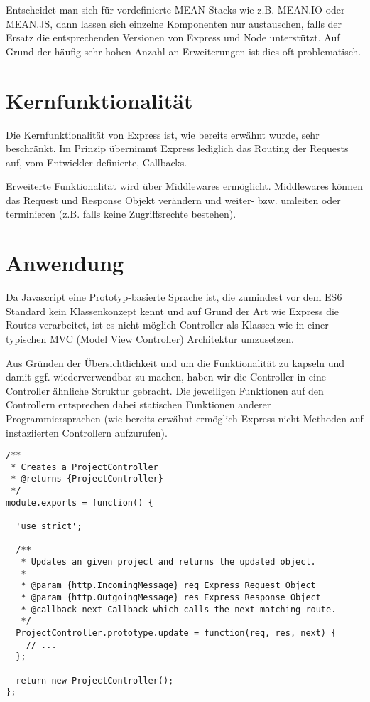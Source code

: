 Entscheidet man sich für vordefinierte MEAN Stacks wie z.B. MEAN.IO oder
MEAN.JS, dann lassen sich einzelne Komponenten nur austauschen, falls
der Ersatz die entsprechenden Versionen von Express und Node
unterstützt. Auf Grund der häufig sehr hohen Anzahl an Erweiterungen ist
dies oft problematisch.

\chapter{Kernfunktionalität}\label{kernfunktionalituxe4t}

Die Kernfunktionalität von Express ist, wie bereits erwähnt wurde, sehr
beschränkt. Im Prinzip übernimmt Express lediglich das Routing der
Requests auf, vom Entwickler definierte, Callbacks.

Erweiterte Funktionalität wird über Middlewares ermöglicht. Middlewares
können das Request und Response Objekt verändern und weiter- bzw.
umleiten oder terminieren (z.B. falls keine Zugriffsrechte bestehen).

\chapter{Anwendung}\label{anwendung}

Da Javascript eine Prototyp-basierte Sprache ist, die zumindest vor dem
ES6 Standard kein Klassenkonzept kennt und auf Grund der Art wie Express
die Routes verarbeitet, ist es nicht möglich Controller als Klassen wie
in einer typischen MVC (Model View Controller) Architektur umzusetzen.

Aus Gründen der Übersichtlichkeit und um die Funktionalität zu kapseln
und damit ggf. wiederverwendbar zu machen, haben wir die Controller in
eine Controller ähnliche Struktur gebracht. Die jeweiligen Funktionen
auf den Controllern entsprechen dabei statischen Funktionen anderer
Programmiersprachen (wie bereits erwähnt ermöglich Express nicht
Methoden auf instaziierten Controllern aufzurufen).

\begin{verbatim}
/**
 * Creates a ProjectController
 * @returns {ProjectController}
 */
module.exports = function() {

  'use strict';

  /**
   * Updates an given project and returns the updated object.
   *
   * @param {http.IncomingMessage} req Express Request Object
   * @param {http.OutgoingMessage} res Express Response Object
   * @callback next Callback which calls the next matching route.
   */
  ProjectController.prototype.update = function(req, res, next) {
    // ...
  };

  return new ProjectController();
};
\end{verbatim}

